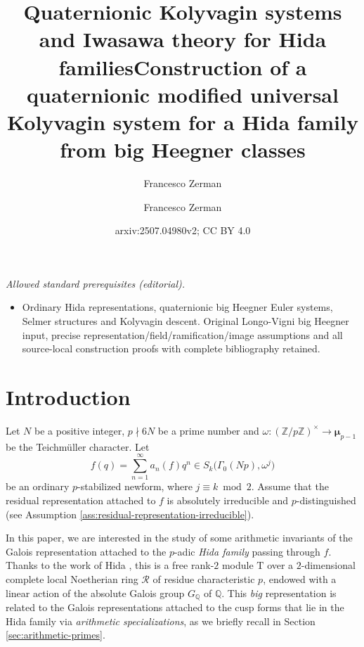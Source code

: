\documentclass[12pt,reqno]{amsart}
\author{Francesco Zerman}
\title{Quaternionic Kolyvagin systems and Iwasawa theory for Hida families}
\title{Construction of a quaternionic modified universal Kolyvagin system for a Hida family from big Heegner classes}
\author{Francesco Zerman}
\date{arxiv:2507.04980v2; CC BY 4.0}
\theoremstyle{definition}
\theoremstyle{remark}
\newcommand{\numberset}{\mathbb}
\newcommand{\Q}{\numberset{Q}}
\newcommand{\Z}{\numberset{Z}}
\newcommand{\T}{\boldsymbol{\mathrm{T}}}
\newcommand{\calR}{\mathcal{R}}
\begin{document}
\maketitle
\noindent\textit{Allowed standard prerequisites (editorial).}\begin{itemize}
\item Ordinary Hida representations, quaternionic big Heegner Euler systems, Selmer structures and Kolyvagin descent. Original Longo-Vigni big Heegner input, precise representation/field/ramification/image assumptions and all source-local construction proofs with complete bibliography retained.
\end{itemize}\medskip
\section{Introduction}

Let $N$ be a positive integer, $p\nmid 6N$ be a prime number and $\omega\colon (\Z/p\Z)^\times\to \boldsymbol{\mu}_{p-1}$ be the Teichm\"uller character. Let 
\begin{equation*}
	f(q)=\sum_{n=1}^\infty a_n(f)q^n\in S_k\big(\Gamma_0(Np),\omega^j\big)
\end{equation*}
be an ordinary $p$-stabilized newform, where $j\equiv k\bmod 2$. Assume that the residual representation attached to $f$ is absolutely irreducible and $p$-distinguished (see Assumption \ref{ass:residual-representation-irreducible}).

In this paper, we are interested in the study of some arithmetic invariants of the Galois representation attached to the $p$-adic \emph{Hida family} passing through $f$. Thanks to the work of Hida \cite{Hida86:Galois-representations, Hida86:Iwasawa-modules}, this is a free rank-$2$ module $\T$ over a $2$-dimensional complete local Noetherian ring $\calR$ of residue characteristic $p$, endowed with a linear action of the absolute Galois group $G_\Q$ of $\Q$. This \emph{big} representation is related to the Galois representations attached to the cusp forms that lie in the Hida family via \emph{arithmetic specializations}, as we briefly recall in Section \ref{sec:arithmetic-primes}.
\end{document}
